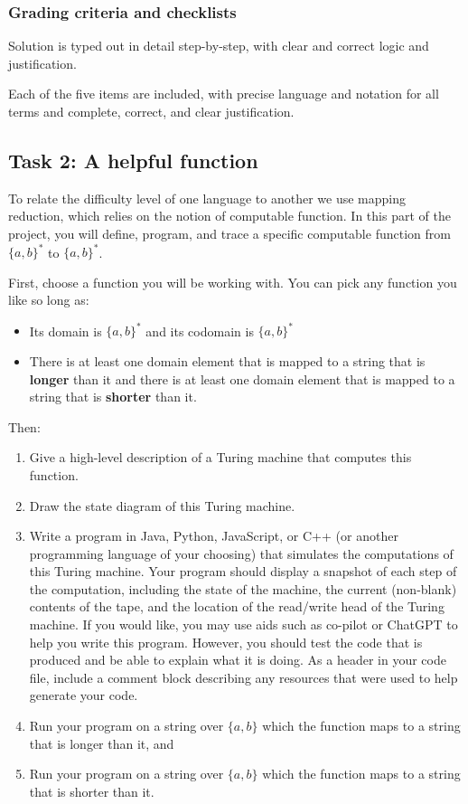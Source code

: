 \documentclass[12pt, oneside]{article}
\begin{document}
\subsubsection*{Grading criteria and checklists}

Solution is typed out in detail step-by-step, with clear and 
correct logic and justification.

Each of the five items are included, with precise language and notation
for all terms and complete, correct, and clear justification.

\newpage
\subsection*{Task 2: A helpful function}

To relate the difficulty level of one language to another 
we use mapping reduction, which relies
on the notion of computable function. In this part of the project, 
you will define, program, and trace a specific 
computable function from $\{a,b\}^*$ to $\{a,b\}^*$.

First, choose a function you will be working with. You can pick any function you like so long as:
	\begin{itemize}
		\item Its domain is $\{a,b\}^*$ and its 
                codomain is $\{a,b\}^*$
		\item There is at least one domain 
                element that is mapped to a string that is 
                {\bf longer} than it and there is at least one 
                domain element that is mapped to a string that is 
                {\bf shorter} than it.
	\end{itemize}
Then:
 \begin{enumerate}
    \item Give a high-level description of a Turing machine that computes
    this function.
    \item Draw the state diagram of this Turing machine.
    \item Write a program in Java, Python, JavaScript, or C++ (or 
        another programming language of your choosing)
        that simulates the computations of this Turing machine.
        Your program should display a snapshot of each step of the computation, 
        including the state of the machine, the current (non-blank)
        contents of the tape, and the location of the read/write head
        of the Turing machine. If you would like, you may 
        use aids such as co-pilot or ChatGPT to help you write this 
        program. However, you should test the code that is 
        produced and be able 
        to explain what it is doing. As a header in 
        your code file, include a comment block describing 
        any resources that were used to help
        generate your code.
    \item Run your program on a string over $\{a,b\}$ which 
        the function maps to a string that is longer than it, and
    \item Run your program on a string over $\{a,b\}$ which 
        the function maps to a string that is shorter than it.
\end{enumerate}
\end{document}
